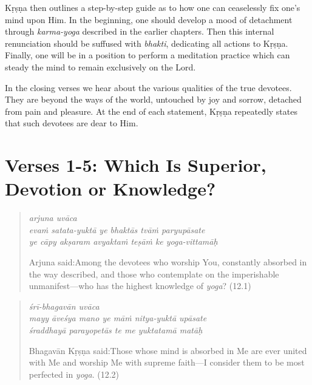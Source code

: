 \documentclass[12pt, twoside, openright]{memoir}
\begin{document}
Kṛṣṇa then outlines a step-by-step guide as to how one can ceaselessly fix one’s mind upon Him. In the beginning, one should develop a mood of detachment through \textit{karma-yoga} described in the earlier chapters. Then this internal renunciation should be suffused with \textit{bhakti}, dedicating all actions to Kṛṣṇa. Finally, one will be in a position to perform a meditation practice which can steady the mind to remain exclusively on the Lord.

In the closing verses we hear about the various qualities of the true devotees. They are beyond the ways of the world, untouched by joy and sorrow, detached from pain and pleasure. At the end of each statement, Kṛṣṇa repeatedly states that such devotees are dear to Him.

\section{Verses 1-5: Which Is Superior, Devotion or Knowledge?}\label{sec-verses-1-5-which-is-superior-devotion-or-knowledge}


\par
\begin{verse}
\textit{arjuna uvāca} \\
\textit{evaṁ satata-yuktā ye bhaktās tvāṁ paryupāsate} \\
\textit{ye cāpy akṣaram avyaktaṁ teṣāṁ ke yoga-vittamāḥ}

\noindent \quad Arjuna said:\linebreak Among the devotees who worship You, constantly absorbed in the way described, and those who contemplate on the imperishable unmanifest---who has the highest knowledge of \textit{yoga}? (12.1)
\end{verse}
\par



\par
\begin{verse}
\textit{śrī-bhagavān uvāca} \\
\textit{mayy āveśya mano ye māṁ nitya-yuktā upāsate} \\
\textit{śraddhayā parayopetās te me yuktatamā matāḥ}

\noindent \quad Bhagavān Kṛṣṇa said:\linebreak Those whose mind is absorbed in Me are ever united with Me and worship Me with supreme faith---I consider them to be most perfected in \textit{yoga}. (12.2)
\end{verse}
\par
\end{document}
